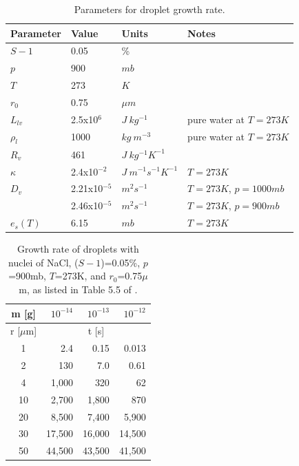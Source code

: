 \documentclass[]{article}
\newcommand{\ra}[1]{\renewcommand{\arraystretch}{#1}}
\begin{document}
\begin{table}[h]
    \centering
    \caption{Parameters for droplet growth rate.}
    \label{tab:parameters}

    \begin{tabular}{l l l l}
    \toprule
    Parameter & Value & Units & Notes\\
    \midrule
    $S - 1$   & 0.05            & \%                         & \\
    $p$       & 900             & $mb$                       & \\
    $T$       & 273             & $K$                        & \\
    $r_0$     & 0.75            & $\mu m$                    & \\
    $L_{lv}$  & 2.5x10$^{6}$    & $J \ kg^{-1}$              & pure water at $T=273 K$ \\
    $\rho_l$  & 1000            & $kg \ m^{-3}$              & pure water at $T=273 K$ \\
    $R_v$     & 461             & $J \ kg^{-1} K^{-1}$       & \\
    $\kappa$  & 2.4x10$^{-2}$   & $J \ m^{-1} s^{-1} K^{-1}$ & $T=273 K$ \\
    $D_v$     & 2.21x10$^{-5}$  & $m^2 s^{-1}$               & $T=273 K$, $p=1000 mb$ \\
              & 2.46x10$^{-5}$  & $m^2 s^{-1}$               & $T=273 K$, $p=900 mb$ \\
    $e_s (T)$ & 6.15            & $mb$                       & $T=273 K$\\
    \bottomrule
    \end{tabular}
\end{table}


\begin{table}[h]
    \centering
    \caption{Growth rate of droplets with nuclei of NaCl, ($S - 1$)=0.05\%,
        $p$=900mb, $T$=273K, and $r_0$=0.75$\mu$m, as listed in Table 5.5 of \cite{Curry}.}
    \label{tab:Table5.5}

    \ra{1.2}
    \begin{tabular}{@{} c r r r @{}}
        \\
        \toprule
        m [g] & $10^{-14}$ & $10^{-13}$ & $10^{-12}$ \\
        \midrule
        r [$\mu$m] & \multicolumn{3}{c}{t [s]} \\
        \midrule
        1  & 2.4    & 0.15   & 0.013 \\
        2  & 130    & 7.0    & 0.61 \\
        4  & 1,000  & 320    & 62 \\
        10 & 2,700  & 1,800  & 870 \\
        20 & 8,500  & 7,400  & 5,900 \\
        30 & 17,500 & 16,000 & 14,500 \\
        50 & 44,500 & 43,500 & 41,500 \\
        \bottomrule
    \end{tabular}
\end{table}
\end{document}
